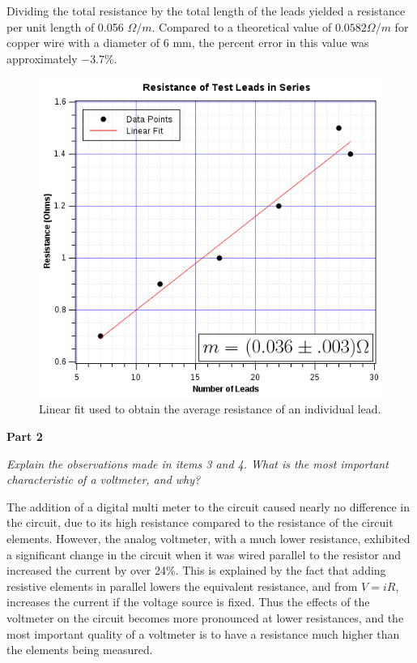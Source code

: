 \documentclass[twocolumn,english]{IEEEtran}
\theoremstyle{plain}
\theoremstyle{plain}
\begin{document}
Dividing the total resistance by the total length of the leads yielded a resistance per unit length of 0.056 $\Omega/m$. Compared to a theoretical value of $0.0582 \Omega/m$ for copper wire with a diameter of 6 mm, the percent error in this value was approximately $-3.7\%$.
\begin{figure}[H]
  \begin{centering}
  \begin{center}
  \includegraphics[width=\linewidth]{./Images/lead_resistance.png}
  \caption{Linear fit used to obtain the average resistance of an individual lead.}
  \label{fig:lead_resistance}
  \end{center}
  \par\end{centering}
  \end{figure}

\textbf{Part 2}

\textit{Explain the observations made in items 3 and 4. What is the most important characteristic of a voltmeter, and why?}

The addition of a digital multi meter to the circuit caused nearly no difference in the circuit, due to its high resistance compared to the resistance of the circuit elements. However, the analog voltmeter, with a much lower resistance, exhibited a significant change in the circuit when it was wired parallel to the resistor and increased the current by over 24\%.
This is explained by the fact that adding resistive elements in parallel lowers the equivalent resistance, and from $V=iR$, increases the current if the voltage source is fixed.
Thus the effects of the voltmeter on the circuit becomes more pronounced at lower resistances, and the most important quality of a voltmeter is to have a resistance much higher than the elements being measured. \\
\end{document}
